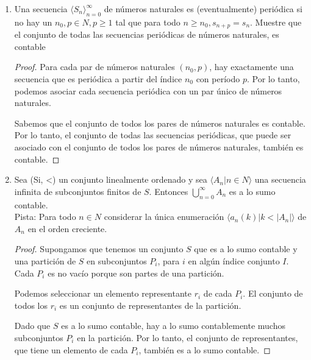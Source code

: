\documentclass{article}
\begin{document}
\begin{enumerate}
\begin{proof}
      Sabemos que el conjunto de todos los pares de números naturales es contable. Por lo tanto, el conjunto de todas las secuencias eventualmente constantes, que puede ser asociado con el conjunto de todos los pares de números naturales, también es contable.
    \end{proof}

  \item Una secuencia $\langle S_n \rangle_{n=0}^{\infty}$ de números naturales es (eventualmente) periódica si no hay un $n_0,p \in N, p \geq 1 $ tal que para todo $n \geq n_0, s_{n+p}=s_n$. Muestre que el conjunto de todas las secuencias periódicas de números naturales, es contable
    \begin{proof}
      Para cada par de números naturales $(n_0, p)$, hay exactamente una secuencia que es periódica a partir del índice $n_0$ con período $p$. Por lo tanto, podemos asociar cada secuencia periódica con un par único de números naturales.

      Sabemos que el conjunto de todos los pares de números naturales es contable. Por lo tanto, el conjunto de todas las secuencias periódicas, que puede ser asociado con el conjunto de todos los pares de números naturales, también es contable.
    \end{proof}


  \item Sea (Si, <) un conjunto linealmente ordenado y sea $\langle A_n | n \in N \rangle$ una secuencia infinita de subconjuntos finitos de $S$. Entonces $\bigcup_{n=0}^{\infty } A_n$ es a lo sumo contable.\\ 
    Pista: Para todo $n \in N$ considerar la única enumeración $\langle a_n(k) | k < |A_n| \rangle$ de $A_n$ en el orden creciente.
    \begin{proof}
      Supongamos que tenemos un conjunto $S$ que es a lo sumo contable y una partición de $S$ en subconjuntos $P_i$, para $i$ en algún índice conjunto $I$. Cada $P_i$ es no vacío porque son partes de una partición.

      Podemos seleccionar un elemento representante $r_i$ de cada $P_i$. El conjunto de todos los $r_i$ es un conjunto de representantes de la partición.

      Dado que $S$ es a lo sumo contable, hay a lo sumo contablemente muchos subconjuntos $P_i$ en la partición. Por lo tanto, el conjunto de representantes, que tiene un elemento de cada $P_i$, también es a lo sumo contable.
    \end{proof}


\end{enumerate}
\end{document}
